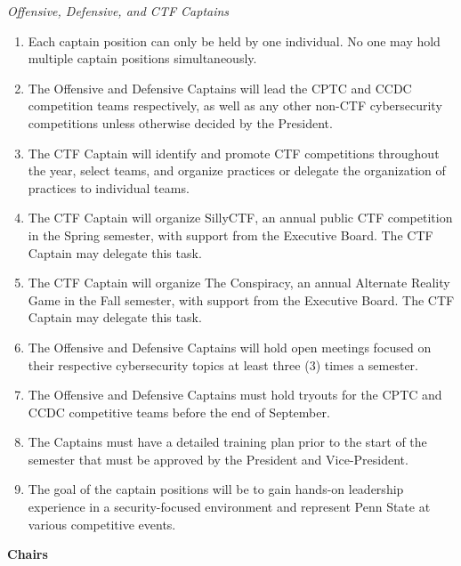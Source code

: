 \documentclass[12pt]{article}
\begin{document}
\textit{Offensive, Defensive, and CTF Captains}
\begin{enumerate}
  \item Each captain position can only be held by one individual. No one may hold multiple captain positions simultaneously.
  \item The Offensive and Defensive Captains will lead the CPTC and CCDC competition teams respectively, as well as any other non-CTF cybersecurity competitions unless otherwise decided by the President.
  \item The CTF Captain will identify and promote CTF competitions throughout the year, select teams, and organize practices or delegate the organization of practices to individual teams.
  \item The CTF Captain will organize SillyCTF, an annual public CTF competition in the Spring semester, with support from the Executive Board. The CTF Captain may delegate this task.
  \item The CTF Captain will organize The Conspiracy, an annual Alternate Reality Game in the Fall semester, with support from the Executive Board. The CTF Captain may delegate this task.
  \item The Offensive and Defensive Captains will hold open meetings focused on their respective cybersecurity topics at least three (3) times a semester.
  \item The Offensive and Defensive Captains must hold tryouts for the CPTC and CCDC competitive teams before the end of September.
  \item The Captains must have a detailed training plan prior to the start of the semester that must be approved by the President and Vice-President.
  \item The goal of the captain positions will be to gain hands-on leadership experience in a security-focused environment and represent Penn State at various competitive events.
\end{enumerate}

\textbf{Chairs}
\end{document}
